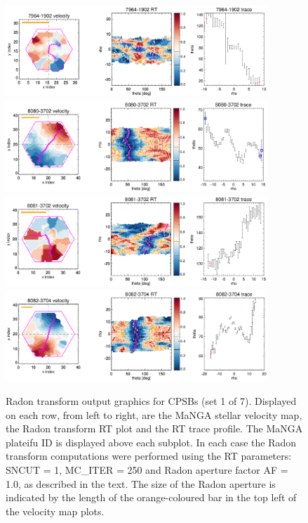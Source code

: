 \documentclass[fleqn,usenatbib]{mnras}
\begin{document}
\begin{figure}
    \centering
    \includegraphics[width=0.88\textwidth]{Images/SN1-MC250/CPSB-triples/CPSB-7964-1902-1-250.png}
    \includegraphics[width=0.88\textwidth]{Images/SN1-MC250/CPSB-triples/CPSB-8080-3702-1-250.png}
    \includegraphics[width=0.88\textwidth]{Images/SN1-MC250/CPSB-triples/CPSB-8081-3702-1-250.png}
    \includegraphics[width=0.88\textwidth]{Images/SN1-MC250/CPSB-triples/CPSB-8082-3704-1-250.png}    
    \caption{Radon transform output graphics for CPSBs (set 1 of 7). Displayed on each row, from left to right, are the MaNGA stellar velocity map, the Radon transform RT plot and the RT trace profile. The MaNGA plateifu ID is displayed above each subplot. In each case the Radon transform computations were performed using the RT parameters: SNCUT = 1, MC\_ITER = 250 and Radon aperture factor AF = 1.0, as described in the text. The size of the Radon aperture is indicated by the length of the orange-coloured bar in the top left of the velocity map plots.}
    \label{fig:CPSB-triples-1}
\end{figure}
\end{document}

